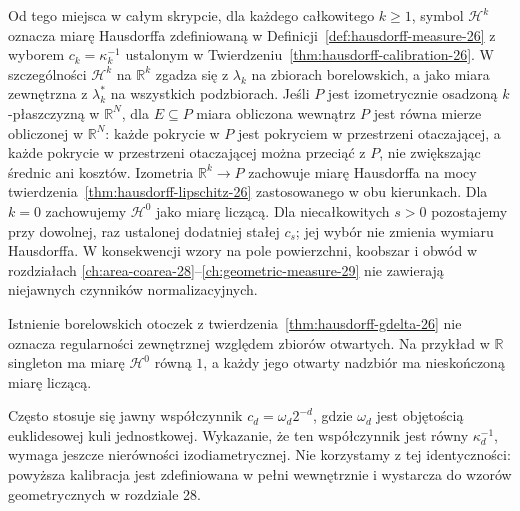 \begin{uwaga}
\label{rem:hausdorff-convention-26}
Od tego miejsca w całym skrypcie, dla każdego całkowitego
$k\ge1$, symbol $\mathcal H^k$ oznacza miarę Hausdorffa
zdefiniowaną w Definicji~\ref{def:hausdorff-measure-26}
z wyborem $c_k=\kappa_k^{-1}$ ustalonym w
Twierdzeniu~\ref{thm:hausdorff-calibration-26}.
W szczególności $\mathcal H^k$ na $\mathbb R^k$
zgadza się z $\lambda_k$ na zbiorach borelowskich,
a jako miara zewnętrzna z $\lambda_k^*$ na wszystkich
podzbiorach. Jeśli $P$ jest izometrycznie
osadzoną $k$-płaszczyzną w $\mathbb R^N$, dla $E\subseteq P$
miara obliczona wewnątrz $P$ jest równa mierze
obliczonej w $\mathbb R^N$: każde pokrycie w $P$
jest pokryciem w przestrzeni otaczającej, a każde
pokrycie w przestrzeni otaczającej można przeciąć z $P$,
nie zwiększając średnic ani kosztów.
Izometria $\mathbb R^k\to P$ zachowuje miarę Hausdorffa
na mocy twierdzenia~\ref{thm:hausdorff-lipschitz-26}
zastosowanego w obu kierunkach.
Dla $k=0$ zachowujemy $\mathcal H^0$ jako miarę liczącą.
Dla niecałkowitych $s>0$ pozostajemy przy dowolnej,
raz ustalonej dodatniej stałej $c_s$; jej wybór nie
zmienia wymiaru Hausdorffa. W konsekwencji wzory
na pole powierzchni, koobszar i obwód w rozdziałach
\ref{ch:area-coarea-28}--\ref{ch:geometric-measure-29}
nie zawierają niejawnych czynników normalizacyjnych.

Istnienie borelowskich otoczek z twierdzenia~\ref{thm:hausdorff-gdelta-26}
nie oznacza regularności zewnętrznej względem zbiorów otwartych.
Na przykład w $\mathbb R$ singleton ma miarę $\mathcal H^0$ równą $1$,
a każdy jego otwarty nadzbiór ma nieskończoną miarę liczącą.
\end{uwaga}

\begin{uwaga}
Często stosuje się jawny współczynnik
$c_d=\omega_d2^{-d}$, gdzie $\omega_d$ jest
objętością euklidesowej kuli jednostkowej.
Wykazanie, że ten współczynnik jest równy
$\kappa_d^{-1}$, wymaga jeszcze nierówności
izodiametrycznej. Nie korzystamy z tej
identyczności: powyższa kalibracja jest
zdefiniowana w pełni wewnętrznie i wystarcza
do wzorów geometrycznych w rozdziale 28.
\end{uwaga}

